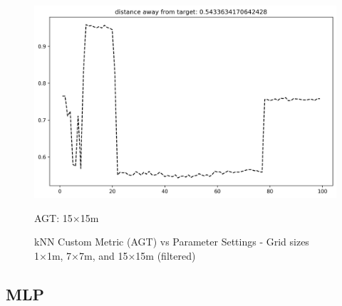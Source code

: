 \documentclass[runningheads]{llncs}
\begin{document}
\begin{figure}[H]
\begin{minipage}{0.32\textwidth}
		\includegraphics[width=\textwidth]{figures/knn_custom_15.png}
		\caption*{AGT: 15×15m}
	\end{minipage}
	\caption{kNN Custom Metric (AGT) vs Parameter Settings - Grid sizes 1×1m, 7×7m, and 15×15m (filtered)}
\end{figure}

\clearpage

\subsection*{MLP}
\end{document}
